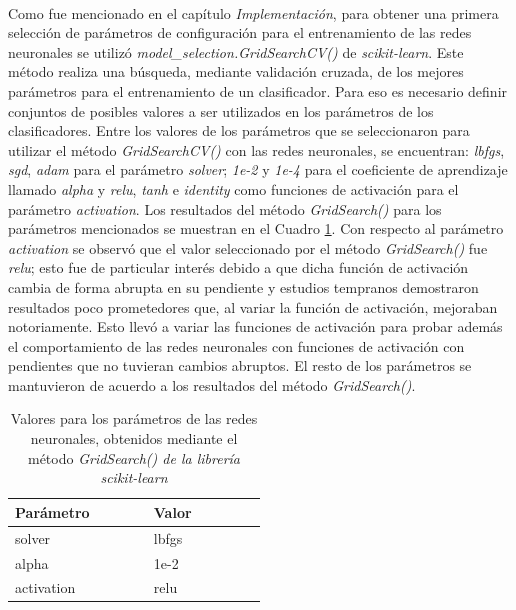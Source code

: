 \paragraph{} Como fue mencionado en el capítulo \textit{Implementación}, para obtener una primera selección de parámetros de configuración para el entrenamiento de las redes neuronales se utilizó \textit{model\_selection.GridSearchCV()} de \textit{scikit-learn}. Este método realiza una búsqueda, mediante validación cruzada, de los mejores parámetros para el entrenamiento de un clasificador. Para eso es necesario definir conjuntos de posibles valores a ser utilizados en los parámetros de los clasificadores. Entre los valores de los parámetros que se seleccionaron para utilizar el método \textit{GridSearchCV()} con las redes neuronales, se encuentran: \textit{lbfgs}, \textit{sgd}, \textit{adam} para el parámetro \textit{solver}; \textit{1e-2} y \textit{1e-4} para el coeficiente de aprendizaje llamado \textit{alpha} y \textit{relu}, \textit{tanh} e \textit{identity} como funciones de activación para el parámetro \textit{activation}. Los resultados del método \textit{GridSearch()} para los parámetros mencionados se muestran en el Cuadro \ref{table:parametros}. Con respecto al parámetro \textit{activation} se observó que el valor seleccionado por el método \textit{GridSearch()} fue \textit{relu}; esto fue de particular interés debido a que dicha función de activación cambia de forma abrupta en su pendiente y estudios tempranos demostraron resultados poco prometedores que, al variar la función de activación, mejoraban notoriamente. Esto llevó a variar las funciones de activación para probar además el comportamiento de las redes neuronales con funciones de activación con pendientes que no tuvieran cambios abruptos. El resto de los parámetros se mantuvieron de acuerdo a los resultados del método \textit{GridSearch()}.
\\

\begin{table}[h!]

\centering
\begin{tabular}{ |p{0.25\linewidth}|p{0.25\linewidth}| } 
\hline
\textbf{Parámetro} & \textbf{Valor}\\
\hline
solver & lbfgs\\ 
\hline
alpha & 1e-2\\ 
\hline
activation & relu\\ 
\hline
\end{tabular}
\caption{ Valores para los parámetros de las redes neuronales, obtenidos mediante el método \textit{GridSearch() de la librería \textit{scikit-learn}}}
\label{table:parametros}
\end{table}

